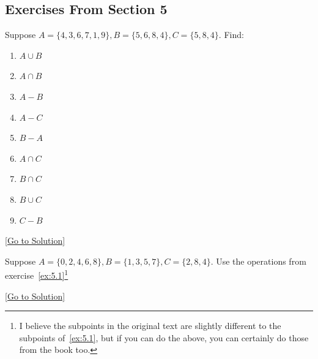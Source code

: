\subsection{Exercises From Section 5}
\begin{exercise}\label{ex:5.1}
    Suppose $A=\{ 4,3,6,7,1,9 \},B=\{ 5,6,8,4 \},C=\{ 5,8,4 \}$. Find: 
    \begin{enumerate}
        \item $A\cup B$
        \item $A\cap B$
        \item $A-B$
        \item $A-C$
        \item $B-A$
        \item $A\cap C$
        \item $B\cap C$
        \item $B\cup C$
        \item $C-B$
    \end{enumerate}
\end{exercise}\hyperref[sol:5.1]{[Go to Solution]}

\begin{exercise}\label{ex:5.2}
    Suppose $A=\{ 0,2,4,6,8 \},B=\{ 1,3,5,7 \},C=\{ 2,8,4 \}$. Use the operations from exercise~\ref{ex:5.1}\footnote{I believe the subpoints in the original text are slightly different to the subpoints of~\ref{ex:5.1}, but if you can do the above, you can certainly do those from the book too.}
\end{exercise}\hyperref[sol:5.2]{[Go to Solution]}